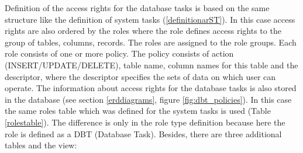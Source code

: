 Definition of the access rights for the database tasks is based on the same structure like the definition of system tasks (\ref{definitionarST}). In this case access rights are also ordered by the roles where the role defines access rights to the group of tables, columns, records. The roles are assigned to the role groups. Each role consists of one or more policy. The policy consists of action (INSERT/UPDATE/DELETE), table name, column names for this table and the descriptor, where the descriptor specifies the sets of data on which user can operate. The information about access rights for the database tasks is also stored in the database (see section \ref{erddiagrams}, figure \ref{fig:dbt_policies}). In this case the same roles table which was defined for the system tasks is used (Table \ref{rolestable}). The difference is only in the role type definition because here the role is defined as a DBT (Database Task). Besides, there are three additional tables and the view:
